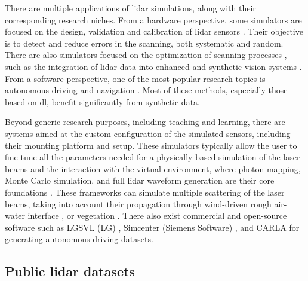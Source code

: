 There are multiple applications of \acrshort{lidar} simulations, along with their corresponding research niches. From a hardware perspective, some simulators are focused on the design, validation and calibration of \acrshort{lidar} sensors \cite{lee_validation_2020}. Their objective is to detect and reduce errors in the scanning, both systematic and random. There are also simulators focused on the optimization of scanning processes \cite{iqbal_simulation_2020, westling_simtreels_2020}, such as the integration of \acrshort{lidar} data into enhanced and synthetic vision systems \cite{peinecke_lidar_2008}. From a software perspective, one of the most popular research topics is autonomous driving \cite{fang_augmented_2020, li_deep_2020} and navigation \cite{manivasagam_lidarsim_2020}. Most of these methods, especially those based on \acrshort{dl}, benefit significantly from synthetic data. 

Beyond generic research purposes, including teaching and learning, there are systems aimed at the custom configuration of the simulated sensors, including their mounting platform and setup. These simulators typically allow the user to fine-tune all the parameters needed for a physically-based simulation of the laser beams and the interaction with the virtual environment, where photon mapping, Monte Carlo simulation, and full \acrshort{lidar} waveform generation are their core foundations \cite{yun_simulation_2019, chen_ole_2020, zohdi_rapid_2020}. These frameworks can simulate multiple scattering of the laser beams, taking into account their propagation through wind-driven rough air-water interface \cite{chen_ole_2020}, or vegetation \cite{yun_simulation_2019, westling_simtreels_2020}. There also exist commercial and open-source software such as LGSVL (LG) \cite{lg_electronics_rd_lab_lgsvl_2021}, Simcenter (Siemens Software) \cite{siemens_simcenter_2021}, and CARLA \cite{dosovitskiy_carla_2017} for generating autonomous driving datasets.

\subsection{Public \acrshort{lidar} datasets}

